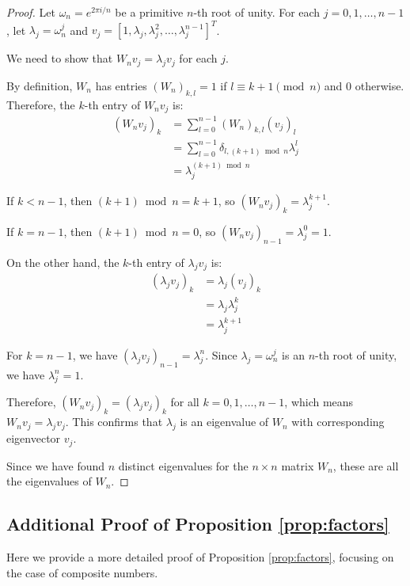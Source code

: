 \begin{proof}
Let $\omega_n = e^{2\pi i/n}$ be a primitive $n$-th root of unity. For each $j = 0, 1, \ldots, n-1$, let $\lambda_j = \omega_n^j$ and $v_j = [1, \lambda_j, \lambda_j^2, \ldots, \lambda_j^{n-1}]^T$.

We need to show that $W_n v_j = \lambda_j v_j$ for each $j$.

By definition, $W_n$ has entries $(W_n)_{k,l} = 1$ if $l \equiv k+1 \pmod{n}$ and $0$ otherwise. Therefore, the $k$-th entry of $W_n v_j$ is:
\begin{align}
(W_n v_j)_k &= \sum_{l=0}^{n-1} (W_n)_{k,l} (v_j)_l \\
&= \sum_{l=0}^{n-1} \delta_{l, (k+1) \bmod n} \lambda_j^l \\
&= \lambda_j^{(k+1) \bmod n}
\end{align}

If $k < n-1$, then $(k+1) \bmod n = k+1$, so $(W_n v_j)_k = \lambda_j^{k+1}$.

If $k = n-1$, then $(k+1) \bmod n = 0$, so $(W_n v_j)_{n-1} = \lambda_j^0 = 1$.

On the other hand, the $k$-th entry of $\lambda_j v_j$ is:
\begin{align}
(\lambda_j v_j)_k &= \lambda_j (v_j)_k \\
&= \lambda_j \lambda_j^k \\
&= \lambda_j^{k+1}
\end{align}

For $k = n-1$, we have $(\lambda_j v_j)_{n-1} = \lambda_j^n$. Since $\lambda_j = \omega_n^j$ is an $n$-th root of unity, we have $\lambda_j^n = 1$.

Therefore, $(W_n v_j)_k = (\lambda_j v_j)_k$ for all $k = 0, 1, \ldots, n-1$, which means $W_n v_j = \lambda_j v_j$. This confirms that $\lambda_j$ is an eigenvalue of $W_n$ with corresponding eigenvector $v_j$.

Since we have found $n$ distinct eigenvalues for the $n \times n$ matrix $W_n$, these are all the eigenvalues of $W_n$.
\end{proof}

\subsection{Additional Proof of Proposition \ref{prop:factors}}

Here we provide a more detailed proof of Proposition \ref{prop:factors}, focusing on the case of composite numbers.

